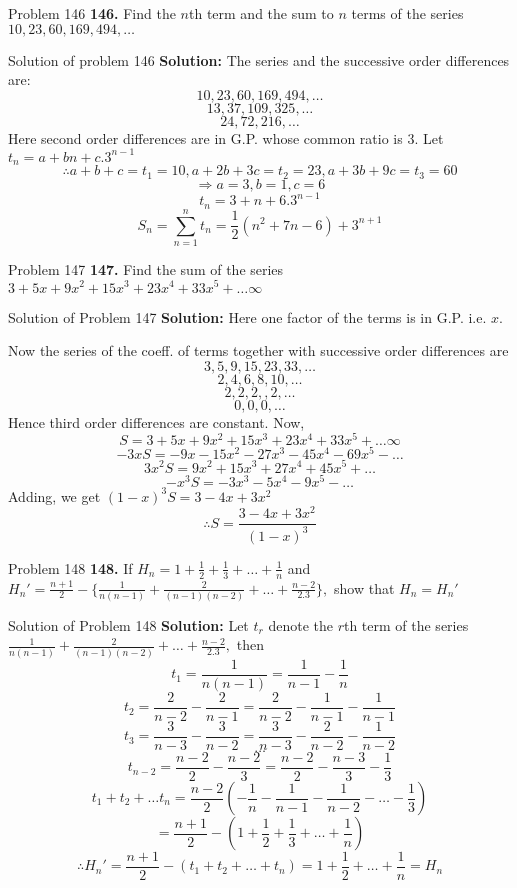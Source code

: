 \documentclass[aspectratio=1610,8pt]{beamer}
\begin{document}
\begin{frame}{Problem 146}
  \textbf{146.} Find the $n$th term and the sum to $n$ terms of the series $10, 23, 60, 169, 494, \ldots$
\end{frame}
\begin{frame}{Solution of problem 146}
  \textbf{Solution:} The series and the successive order differences are:
  $$10, 23, 60, 169, 494, \ldots$$
  $$13, 37, 109, 325, \ldots$$
  $$24, 72, 216, \ldots$$
  Here second order differences are in G.P. whose common ratio is $3.$ Let $t_n = a + bn + c.3^{n - 1}$
  $$\therefore a + b + c = t_1 = 10, a + 2b + 3c = t_2 = 23, a + 3b + 9c = t_3 = 60$$
  $$\Rightarrow a = 3, b = 1, c = 6$$
  $$t_n = 3 + n + 6.3^{n - 1}$$
  $$S_n = \sum_{n = 1}^n t_n = \frac{1}{2}(n^2 + 7n - 6) + 3^{n + 1}$$
\end{frame}
\begin{frame}{Problem 147}
  \textbf{147.} Find the sum of the series $3 + 5x + 9x^2 + 15x^3 + 23x^4 + 33x^5 + \ldots \infty$
\end{frame}
\begin{frame}{Solution of Problem 147}
  \textbf{Solution:} Here one factor of the terms is in G.P. i.e. $x.$

  Now the series of the coeff. of terms together with successive order differences are
  $$3, 5, 9, 15, 23, 33, \ldots$$
  $$2, 4, 6, 8, 10, \ldots$$
  $$2, 2, 2, ,2, \ldots$$
  $$0, 0, 0, \ldots$$
  Hence third order differences are constant. Now,
  $$S = 3 + 5x + 9x^2 + 15x^3 + 23x^4 + 33x^5 + \ldots \infty$$
  $$-3xS = -9x - 15x^2 - 27x^3 - 45x^4 - 69x^5 -\ldots$$
  $$3x^2S = 9x^2 + 15x^3 + 27x^4 + 45x^5 + \ldots$$
  $$-x^3S = -3x^3 - 5x^4 - 9x^5 - \ldots$$
  Adding, we get $(1 - x)^3S = 3 - 4x + 3x^2$
  $$\therefore S = \frac{3 - 4x + 3x^2}{(1 - x)^3}$$
\end{frame}
\begin{frame}{Problem 148}
  \textbf{148.} If $H_n = 1 + \frac{1}{2} + \frac{1}{3} + \ldots + \frac{1}{n}$ and $H_n' = \frac{n + 1}{2} - \{\frac{1}{n(n - 1)}
  + \frac{2}{(n - 1)(n - 2)} + \ldots + \frac{n - 2}{2.3}\},$ show that $H_n = H_n'$
\end{frame}
\begin{frame}{Solution of Problem 148}
  \textbf{Solution:} Let $t_r$ denote the $r$th term of the series $\frac{1}{n(n - 1)} + \frac{2}{(n - 1)(n - 2)} + \ldots +
  \frac{n - 2}{2.3},$ then
  $$t_1 = \frac{1}{n(n - 1)} = \frac{1}{n - 1} - \frac{1}{n}$$
  $$t_2 = \frac{2}{n - 2} - \frac{2}{n - 1} = \frac{2}{n - 2} - \frac{1}{n - 1} - \frac{1}{n - 1}$$
  $$t_3 = \frac{3}{n - 3} - \frac{3}{n - 2} = \frac{3}{n - 3} - \frac{2}{n - 2} - \frac{1}{n - 2}$$
  $$\ldots$$
  $$t_{n - 2} = \frac{n - 2}{2} - \frac{n - 2}{3} = \frac{n - 2}{2} - \frac{n - 3}{3} - \frac{1}{3}$$
  $$t_1 + t_2 + \ldots t_n = \frac{n - 2}{2}\left(-\frac{1}{n} - \frac{1}{n - 1} -\frac{1}{n - 2} -\ldots -\frac{1}{3}\right)$$
  $$= \frac{n + 1}{2} - \left(1 + \frac{1}{2} + \frac{1}{3} + \ldots + \frac{1}{n}\right)$$
  $$\therefore H_n' = \frac{n + 1}{2} - (t_1 + t_2 + \ldots + t_n) = 1 + \frac{1}{2} + \ldots + \frac{1}{n} = H_n$$
\end{frame}
\end{document}
